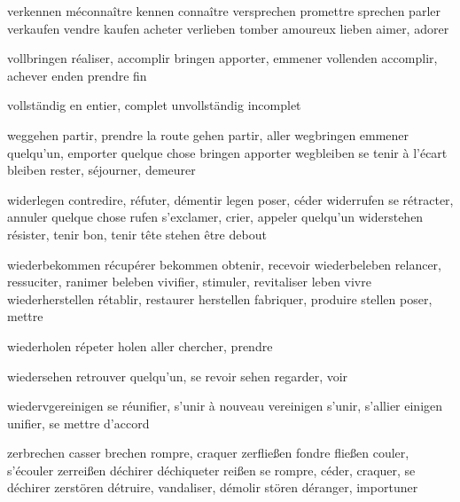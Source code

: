 verkennen                        méconnaître
kennen                           connaître
versprechen                      promettre
sprechen                         parler
verkaufen                        vendre
kaufen                           acheter
verlieben                        tomber amoureux
lieben                           aimer, adorer

vollbringen                      réaliser, accomplir
bringen                          apporter, emmener
vollenden                        accomplir, achever
enden                            prendre fin

vollständig                      en entier, complet
unvollständig                    incomplet

weggehen                         partir, prendre la route
gehen                            partir, aller
wegbringen                       emmener quelqu'un, emporter quelque chose
bringen                          apporter
wegbleiben                       se tenir à l'écart
bleiben                          rester, séjourner, demeurer

widerlegen                       contredire, réfuter, démentir
legen                            poser, céder
widerrufen                       se rétracter, annuler quelque chose
rufen                            s'exclamer, crier, appeler quelqu'un
widerstehen                      résister, tenir bon, tenir tête
stehen                           être debout

wiederbekommen                   récupérer
bekommen                         obtenir, recevoir
wiederbeleben                    relancer, ressuciter, ranimer
beleben                          vivifier, stimuler, revitaliser
leben                            vivre
wiederherstellen                 rétablir, restaurer
herstellen                       fabriquer, produire
stellen                          poser, mettre

wiederholen                      répeter
holen                            aller chercher, prendre

wiedersehen                      retrouver quelqu'un, se revoir
sehen                            regarder, voir

wiedervgereinigen                se réunifier, s'unir à nouveau
vereinigen                       s'unir, s'allier
einigen                          unifier, se mettre d'accord

zerbrechen                       casser
brechen                          rompre, craquer
zerfließen                       fondre
fließen                          couler, s'écouler
zerreißen                        déchirer déchiqueter
reißen                           se rompre, céder, craquer, se déchirer
zerstören                        détruire, vandaliser, démolir
stören                           déranger, importuner

